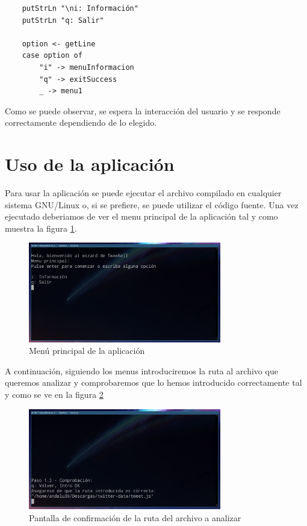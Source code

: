 \documentclass[11pt]{article}
\begin{document}
\begin{itemize}
\begin{itemize}
\begin{verbatim}
    putStrLn "\ni: Información"
    putStrLn "q: Salir"

    option <- getLine
    case option of
        "i" -> menuInformacion
        "q" -> exitSuccess
        _ -> menu1
        \end{verbatim}
        
        Como se puede observar, se espera la interacción del usuario y se responde correctamente dependiendo de lo elegido.
        
        
        
    \end{itemize}
    
\end{itemize}

\section{Uso de la aplicación}
Para usar la aplicación se puede ejecutar el archivo compilado en cualquier sistema GNU/Linux o, si se prefiere, se puede utilizar el código fuente.
Una vez ejecutado deberiamos de ver el menu principal de la aplicación tal y como muestra la figura \ref{fig_menuprincipal}.

\begin{figure}[h]
    \centering
    \includegraphics[width=0.75\textwidth]{menuPrincipal.png}
    \caption{Menú principal de la aplicación}
    \label{fig_menuprincipal}
\end{figure}
\medskip

A continuación, siguiendo los menus introduciremos la ruta al archivo que queremos analizar y comprobaremos que lo hemos introducido correctamente tal y como se ve en la figura \ref{fig_comprobacion}

\begin{figure}[h]
    \centering
	\includegraphics[width=0.75\textwidth]{comprobacion.png}
    \caption{Pantalla de confirmación de la ruta del archivo a analizar}
    \label{fig_comprobacion}
\end{figure}
\medskip
\end{document}
